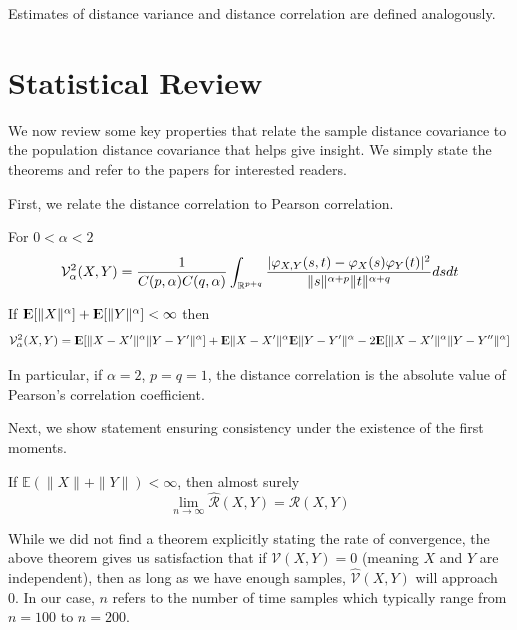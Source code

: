 Estimates of distance variance and distance correlation are defined
analogously.

\section{Statistical Review}
We now review some key properties that relate the sample distance
covariance to the population distance covariance that helps give
insight. We simply state the theorems and refer to the papers for
interested readers.

First, we relate the distance correlation to Pearson correlation.

\begin{definition}  
For $0 < \alpha < 2$
$$ \mathcal{V}_\alpha^2 (X,Y)
 = \frac{1}{C(p,\alpha) C(q,\alpha)}
   \int_{\mathbb{R}^{p+q}} \frac{|\varphi_{X,Y}(s,t) -
                          \varphi_X(s) \varphi_Y(t)|^2}
                        {\|s\|^{\alpha + p} \|t\|^{\alpha + q}} ds dt $$
\end{definition}

\begin{prop}
If ${\rm I\kern-.3em E}[\|X\|^\alpha] + {\rm I\kern-.3em E}[\|Y\|^\alpha] < \infty$ then
$$ \mathcal{V}_\alpha^2 (X,Y) = {\rm I\kern-.3em E}[ \|X - X'\|^\alpha \|Y - Y'\|^\alpha ] + {\rm I\kern-.3em E} \|X - X'\|^\alpha {\rm I\kern-.3em E} \|Y - Y'\|^\alpha - 2 {\rm I\kern-.3em E}[ \|X - X'\|^\alpha \|Y - Y''\|^\alpha ]$$

In particular, if $\alpha = 2$, $p = q = 1$, the distance correlation is 
the absolute value of Pearson's correlation coefficient.
\end{prop}

Next, we show statement ensuring consistency under the existence of the
first moments.

\begin{prop}
If $\mathbb{E}(\|X\| +\|Y\|)< \infty$, then almost surely
\[
\lim_{n\rightarrow\infty}\widehat{\mathcal{R}}(X,Y) = \mathcal{R}(X,Y)
\]
\end{prop}

While we did not find a theorem explicitly stating the rate of 
convergence, the above theorem gives us satisfaction that if
$\mathcal{V}(X,Y)=0$ (meaning $X$ and $Y$ are independent), then as long 
as we have enough samples, $\widehat{\mathcal{V}}(X,Y) $ will approach
0. In our case, $n$ refers to the number of time samples which
typically range from $n=100$ to $n=200$.


